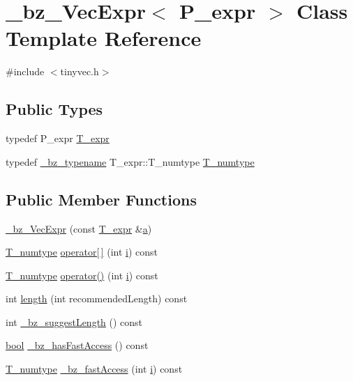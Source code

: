 \hypertarget{class__bz__VecExpr}{}\section{\+\_\+bz\+\_\+\+Vec\+Expr$<$ P\+\_\+expr $>$ Class Template Reference}
\label{class__bz__VecExpr}


{\ttfamily \#include $<$tinyvec.\+h$>$}

\subsection*{Public Types}
\begin{DoxyCompactItemize}
\item 
typedef P\+\_\+expr \hyperlink{class__bz__VecExpr_a90eb5d7b7a7d258c358c08a4a784d699}{T\+\_\+expr}
\item 
typedef \hyperlink{compiler_8h_a1bc40add3e72effc9cf69dbe445cbdfd}{\+\_\+bz\+\_\+typename} T\+\_\+expr\+::\+T\+\_\+numtype \hyperlink{class__bz__VecExpr_ab7447aabb0c245aab4cb0285d05b590e}{T\+\_\+numtype}
\end{DoxyCompactItemize}
\subsection*{Public Member Functions}
\begin{DoxyCompactItemize}
\item 
\hyperlink{class__bz__VecExpr_a42cb44b72eb1f3eb27c353fb9ee4b00a}{\+\_\+bz\+\_\+\+Vec\+Expr} (const \hyperlink{class__bz__VecExpr_a90eb5d7b7a7d258c358c08a4a784d699}{T\+\_\+expr} \&\hyperlink{gen__mat5files_8m_aae328bf20413f220e38aec4d95bfd6da}{a})
\item 
\hyperlink{class__bz__VecExpr_ab7447aabb0c245aab4cb0285d05b590e}{T\+\_\+numtype} \hyperlink{class__bz__VecExpr_ad503864c2f920cd3cbea26ae338e04a4}{operator\mbox{[}$\,$\mbox{]}} (int \hyperlink{indexexpr_8h_aabd77643995707c185e95c8cb2782c81}{i}) const 
\item 
\hyperlink{class__bz__VecExpr_ab7447aabb0c245aab4cb0285d05b590e}{T\+\_\+numtype} \hyperlink{class__bz__VecExpr_a700dcf68cfee206f8c79afee9153e4d7}{operator()} (int \hyperlink{indexexpr_8h_aabd77643995707c185e95c8cb2782c81}{i}) const 
\item 
int \hyperlink{class__bz__VecExpr_a88422534393a3af46be5ef0c4c41d4e6}{length} (int recommended\+Length) const 
\item 
int \hyperlink{class__bz__VecExpr_ac2f2f2792269c06fc4e0e6a19de2a74d}{\+\_\+bz\+\_\+suggest\+Length} () const 
\item 
\hyperlink{compiler_8h_abb452686968e48b67397da5f97445f5b}{bool} \hyperlink{class__bz__VecExpr_a9e192e0b53d42bf15d2664c08ca65fce}{\+\_\+bz\+\_\+has\+Fast\+Access} () const 
\item 
\hyperlink{class__bz__VecExpr_ab7447aabb0c245aab4cb0285d05b590e}{T\+\_\+numtype} \hyperlink{class__bz__VecExpr_a9dff866bd3a2132a8ec0c2accc3a7cc0}{\+\_\+bz\+\_\+fast\+Access} (int \hyperlink{indexexpr_8h_aabd77643995707c185e95c8cb2782c81}{i}) const 
\end{DoxyCompactItemize}

